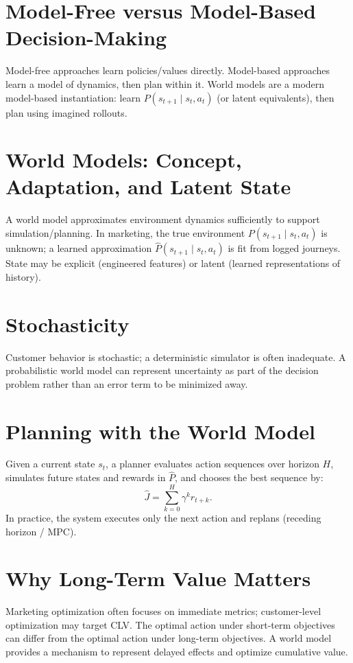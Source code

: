 \documentclass[11pt]{article}
\newcommand{\st}{s_t}
\newcommand{\stnext}{s_{t+1}}
\newcommand{\at}{a_t}
\newcommand{\wm}{\hat{P}}
\begin{document}
\section{Model-Free versus Model-Based Decision-Making}
Model-free approaches learn policies/values directly. Model-based approaches learn a model of dynamics, then plan within it. World models are a modern model-based instantiation: learn $P(\stnext\mid \st,\at)$ (or latent equivalents), then plan using imagined rollouts.

\section{World Models: Concept, Adaptation, and Latent State}
A world model approximates environment dynamics sufficiently to support simulation/planning. In marketing, the true environment $P(\stnext\mid \st,\at)$ is unknown; a learned approximation $\wm(\stnext\mid \st,\at)$ is fit from logged journeys. State may be explicit (engineered features) or latent (learned representations of history).

\section{Stochasticity}
Customer behavior is stochastic; a deterministic simulator is often inadequate. A probabilistic world model can represent uncertainty as part of the decision problem rather than an error term to be minimized away.

\section{Planning with the World Model}
Given a current state $\st$, a planner evaluates action sequences over horizon $H$, simulates future states and rewards in $\wm$, and chooses the best sequence by:
\[
\hat{J}=\sum_{k=0}^{H}\gamma^k \hat{r}_{t+k}.
\]
In practice, the system executes only the next action and replans (receding horizon / MPC).

\section{Why Long-Term Value Matters}
Marketing optimization often focuses on immediate metrics; customer-level optimization may target CLV. The optimal action under short-term objectives can differ from the optimal action under long-term objectives. A world model provides a mechanism to represent delayed effects and optimize cumulative value.
\end{document}
